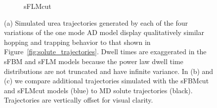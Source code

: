 \documentclass[journal=jctcce,manuscript=article]{achemso}
\begin{document}
\begin{figure}
\begin{subfigure}{0.325\textwidth}
  \caption{sFLMcut}\label{fig:ad_realizations_sFLMcut_stacked}
  \end{subfigure}
  \caption{(a) Simulated urea trajectories generated by each of the four
	  variations of the one mode AD model display qualitatively similar
	  hopping and trapping behavior to that shown in
	  Figure~\ref{fig:solute_trajectories}. Dwell times are exaggerated in
	  the sFBM and sFLM models because the power law dwell time
	  distributions are not truncated and have infinite variance. In (b)
	  and (c) we compare additional trajectories simulated with the sFBMcut
	  and sFLMcut models (blue) to MD solute trajectories (black).
	  Trajectories are vertically offset for visual clarity.
  }\label{fig:ad_eyetest}
  \end{figure}
    
%
%  
\end{document}
